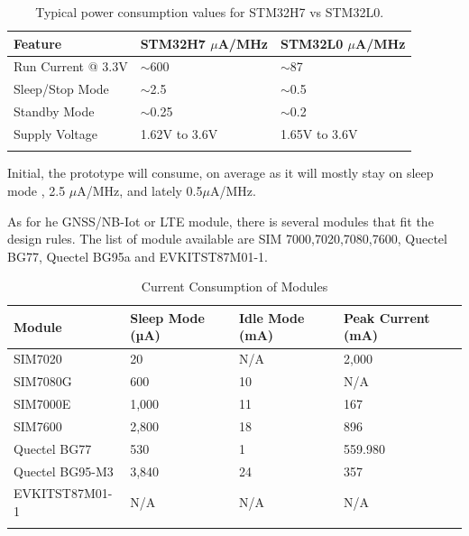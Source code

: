 \begin{table}[h!]
    \centering
    \begin{tabular}{l|l|l}
        \textbf{Feature} & \textbf{STM32H7 $\mu$A/MHz} & \textbf{STM32L0 $\mu$A/MHz} \\ 
        \hline
        \arrayrulecolor[gray]{0.85}
        Run Current @ 3.3V & $\sim$600    & $\sim$87  \\
        \hline
        Sleep/Stop Mode    & $\sim$2.5    & $\sim$0.5 \\
        \hline
        Standby Mode       & $\sim$0.25   & $\sim$0.2 \\
        \hline
        Supply Voltage     & 1.62V to 3.6V & 1.65V to 3.6V \\
        \arrayrulecolor{black}
    \end{tabular}
    \caption{Typical power consumption values for STM32H7 vs STM32L0.}
    \label{table:typical_power_consumption_stm32}
\end{table}

Initial, the prototype will consume, on average as it will mostly stay on sleep mode
, 2.5 $\mu$A/MHz, and lately 0.5$\mu$A/MHz. 

As for he GNSS/NB-Iot or LTE module, there is several modules that fit the design rules.
The list of module available are SIM 7000,7020,7080,7600, Quectel BG77, Quectel BG95a 
and EVKITST87M01-1.

\begin{table}[h!]
    \centering
    \begin{tabular}{l|l|l|l}
        \textbf{Module} & \textbf{Sleep Mode (µA)} & \textbf{Idle Mode (mA)} & \textbf{Peak Current (mA)} \\
        \hline
        \arrayrulecolor[gray]{0.85}
        SIM7020         & 20    & N/A  & 2,000 \\
        \hline
        SIM7080G        & 600   & 10   & N/A   \\
        \hline
        SIM7000E        & 1,000 & 11   & 167   \\
        \hline
        SIM7600         & 2,800 & 18   & 896   \\
        \hline
        Quectel BG77    & 530   & 1    & 559.980 \\
        \hline
        Quectel BG95-M3 & 3,840 & 24   & 357   \\
        \hline
        EVKITST87M01-1  & N/A   & N/A  & N/A   \\
        \arrayrulecolor{black}
    \end{tabular}
    \caption{Current Consumption of Modules}
    \label{table:current_consumption_modules}
\end{table}

